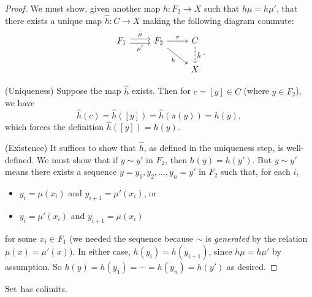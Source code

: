 \documentclass[12pt]{article}
\begin{document}
\begin{proof}
	We must show, given another map $h:F_2\to X$ such that $h\mu=h\mu'$, that there exists a unique map $\hat{h}:C\to X$ making the following diagram commute:
	\begin{equation*}
\begin{tikzcd}
F_1 \arrow[r, "\mu", shift left] \arrow[r, "\mu'"', shift right] & F_2 \arrow[r, "\pi"] \arrow[rd, "h"'] & C \arrow[d, "\hat{h}", dashed] \\
                                                                 &                                       & X                             
\end{tikzcd}.
	\end{equation*}

	(Uniqueness) Suppose the map $\hat{h}$ exists. Then for $c=[y]\in C$ (where $y\in F_2$), we have 
	\begin{equation*}
		\hat{h}(c)=\hat{h}([y])=\hat{h}(\pi(y)) = h(y),
	\end{equation*}
	which forces the definition $\hat{h}([y])=h(y)$.

	(Existence) It suffices to show that $\hat{h}$, as defined in the uniqueness step, is well-defined. We must show that if $y\sim y'$ in $F_2$, then $h(y)=h(y')$. But $y\sim y'$ means there exists a sequence $y=y_1, y_2,\dots, y_n=y'$ in $F_2$ such that, for each $i$, 
	\begin{itemize}
		\item $y_i=\mu(x_i)$ and $y_{i+1}=\mu'(x_i)$, or
		\item $y_i=\mu'(x_i)$ and $y_{i+1}=\mu(x_i)$ 
	\end{itemize}
	for some $x_i\in F_1$ (we needed the sequence because $\sim$ is \textit{generated} by the relation $\mu(x)=\mu'(x)$). In either case, $h(y_i)=h(y_{i+1})$, since $h\mu=h\mu'$ by assumption. So $h(y)=h(y_1)=\cdots=h(y_n)=h(y')$ as desired.
\end{proof}

\begin{corollary}
	$\text{Set}$ has colimits.
\end{corollary}

\end{document}
